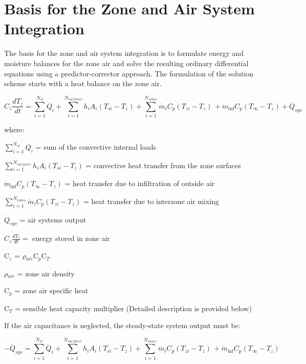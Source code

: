 \section{Basis for the Zone and Air System Integration}\label{basis-for-the-zone-and-air-system-integration}

The basis for the zone and air system integration is to formulate energy and moisture balances for the zone air and solve the resulting ordinary differential equations using a predictor-corrector approach. The formulation of the solution scheme starts with a heat balance on the zone air.

\begin{equation}
{C_z}\frac{{d{T_z}}}{{dt}} = \sum\limits_{i = 1}^{{N_{sl}}} {{{\dot Q}_i}}  + \sum\limits_{i = 1}^{{N_{surfaces}}} {{h_i}} {A_i}\left( {{T_{si}} - {T_z}} \right) + \sum\limits_{i = 1}^{{N_{zones}}} {{{\dot m}_i}} {C_p}\left( {{T_{zi}} - {T_z}} \right)\, + {\dot m_{\inf }}{C_p}\left( {{T_\infty } - {T_z}} \right) + {\dot Q_{sys}}
\end{equation}

where:

\(\sum\limits_{i = 1}^{{N_{sl}}} {{{\dot Q}_i}}\) = sum of the convective internal loads

\(\sum\limits_{i = 1}^{{N_{surfaces}}} {{h_i}} {A_i}\left( {{T_{si}} - {T_z}} \right)\) = convective heat transfer from the zone surfaces

\({\dot m_{\inf }}{C_p}\left( {{T_\infty } - {T_z}} \right)\) = heat transfer due to infiltration of outside air

\(\sum_{i = 1}^{N_{zones}} \dot m_i C_p\left( T_{zi} - {T_z} \right)\) = heat transfer due to interzone air mixing

\({\dot Q_{sys}}\) = air systems output

${C_z}\frac{dT_z}{dt} =$ energy stored in zone air

C\(_{z}\) = $\rho$\(_{air}\)C\(_{p}\)C\(_{T}\)

$\rho$\(_{air}\) = zone air density

C\(_{p}\) = zone air specific heat

C\(_{T}\) = sensible heat capacity multiplier (Detailed description is provided below)

If the air capacitance is neglected, the steady-state system output must be:

\begin{equation}
- {\dot Q_{sys}} = \sum\limits_{i = 1}^{{N_{sl}}} {{{\dot Q}_i}}  + \sum\limits_{i = 1}^{{N_{surfaces}}} {{h_i}} {A_i}\left( {{T_{si}} - {T_z}} \right) + \sum\limits_{i = 1}^{{N_{zones}}} {{{\dot m}_i}} {C_p}\left( {{T_{zi}} - {T_z}} \right)\, + {\dot m_{\inf }}{C_p}\left( {{T_\infty } - {T_z}} \right)
\end{equation}

